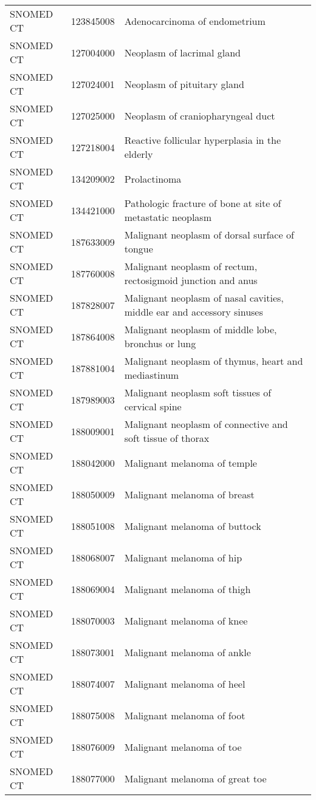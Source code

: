 \begin{longtable}{p{}p{}p{}}
  SNOMED CT & 123845008 & Adenocarcinoma of endometrium \\ 
  SNOMED CT & 127004000 & Neoplasm of lacrimal gland \\ 
  SNOMED CT & 127024001 & Neoplasm of pituitary gland \\ 
  SNOMED CT & 127025000 & Neoplasm of craniopharyngeal duct \\ 
  SNOMED CT & 127218004 & Reactive follicular hyperplasia in the elderly \\ 
  SNOMED CT & 134209002 & Prolactinoma \\ 
  SNOMED CT & 134421000 & Pathologic fracture of bone at site of metastatic neoplasm \\ 
  SNOMED CT & 187633009 & Malignant neoplasm of dorsal surface of tongue \\ 
  SNOMED CT & 187760008 & Malignant neoplasm of rectum, rectosigmoid junction and anus \\ 
  SNOMED CT & 187828007 & Malignant neoplasm of nasal cavities, middle ear and accessory sinuses \\ 
  SNOMED CT & 187864008 & Malignant neoplasm of middle lobe, bronchus or lung \\ 
  SNOMED CT & 187881004 & Malignant neoplasm of thymus, heart and mediastinum \\ 
  SNOMED CT & 187989003 & Malignant neoplasm soft tissues of cervical spine \\ 
  SNOMED CT & 188009001 & Malignant neoplasm of connective and soft tissue of thorax \\ 
  SNOMED CT & 188042000 & Malignant melanoma of temple \\ 
  SNOMED CT & 188050009 & Malignant melanoma of breast \\ 
  SNOMED CT & 188051008 & Malignant melanoma of buttock \\ 
  SNOMED CT & 188068007 & Malignant melanoma of hip \\ 
  SNOMED CT & 188069004 & Malignant melanoma of thigh \\ 
  SNOMED CT & 188070003 & Malignant melanoma of knee \\ 
  SNOMED CT & 188073001 & Malignant melanoma of ankle \\ 
  SNOMED CT & 188074007 & Malignant melanoma of heel \\ 
  SNOMED CT & 188075008 & Malignant melanoma of foot \\ 
  SNOMED CT & 188076009 & Malignant melanoma of toe \\ 
  SNOMED CT & 188077000 & Malignant melanoma of great toe \\ 

\end{longtable}
